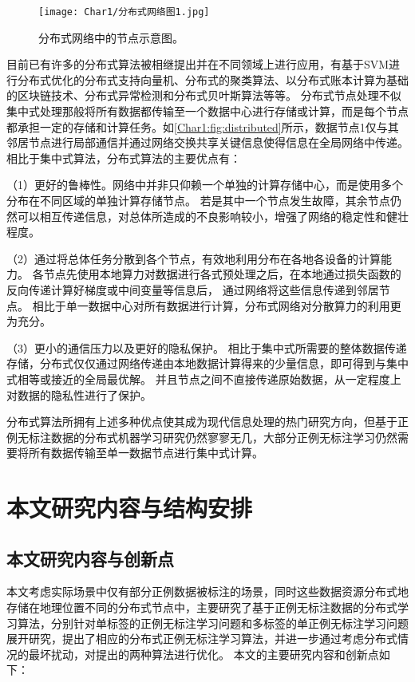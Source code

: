 \begin{figure}[htbp]
    \centering
    \texttt{[image: Char1/分布式网络图1.jpg]}
    \caption{\label{Char1:fig:distributed}分布式网络中的节点示意图。}
\end{figure}

目前已有许多的分布式算法被相继提出并在不同领域上进行应用，有基于SVM进行分布式优化的分布式支持向量机\cite{Lu_DistributedSVM_2016,Liu_SemiSVM_2018,Scardapane_Distributed_2016, Hou_hdsvm_2017}、分布式的聚类算法\cite{Kotary_distributed_2020}、以分布式账本计算为基础的区块链技术\cite{Kuo_BlockChain_2017}、分布式异常检测\cite{Miao_Distributed_2018}和分布式贝叶斯算法\cite{Hua_Distributed_2015}等等。
分布式节点处理不似集中式处理那般将所有数据都传输至一个数据中心进行存储或计算，而是每个节点都承担一定的存储和计算任务。{如\autoref{Char1:fig:distributed}所示，数据节点1仅与其邻居节点进行局部通信并通过网络交换共享关键信息使得信息在全局网络中传递。}
相比于集中式算法，分布式算法的主要优点有：

（1）更好的鲁棒性。网络中并非只仰赖一个单独的计算存储中心，而是使用多个分布在不同区域的单独计算存储节点。
若是其中一个节点发生故障，其余节点仍然可以相互传递信息，对总体所造成的不良影响较小，增强了网络的稳定性和健壮程度\cite{Miao_Distributed_2018}。

（2）通过将总体任务分散到各个节点，有效地利用分布在各地各设备的计算能力。
各节点先使用本地算力对数据进行各式预处理之后，在本地通过损失函数的反向传递计算好梯度或中间变量等信息后，
通过网络将这些信息传递到邻居节点\cite{Verbraeken_Survey_2020}。
相比于单一数据中心对所有数据进行计算，分布式网络对分散算力的利用更为充分。

（3）更小的通信压力以及更好的隐私保护。
相比于集中式所需要的整体数据传递存储，分布式仅仅通过网络传递由本地数据计算得来的少量信息，即可得到与集中式相等或接近的全局最优解\cite{Scardapane_Distributed_2016}。
并且节点之间不直接传递原始数据，从一定程度上对数据的隐私性进行了保护\cite{Shen_Distributed_2014}。

{分布式算法所拥有上述多种优点使其成为现代信息处理的热门研究方向，但基于正例无标注数据的分布式机器学习研究仍然寥寥无几，大部分正例无标注学习仍然需要将所有数据传输至单一数据节点进行集中式计算。}

\section{本文研究内容与结构安排}
\subsection{本文研究内容与创新点}
{本文考虑实际场景中仅有部分正例数据被标注的场景，同时这些数据资源分布式地存储在地理位置不同的分布式节点中，主要研究了基于正例无标注数据的分布式学习算法，分别针对单标签的正例无标注学习问题和多标签的单正例无标注学习问题展开研究，提出了相应的分布式正例无标注学习算法，并进一步通过考虑分布式情况的最坏扰动，对提出的两种算法进行优化。}
本文的主要研究内容和创新点如下：

